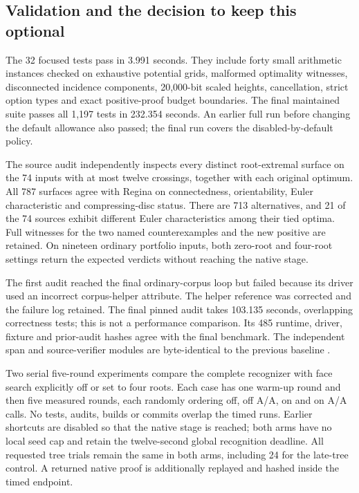\subsection{Validation and the decision to keep this optional}

The 32 focused tests pass in 3.991 seconds. They include forty small
arithmetic instances checked on exhaustive potential grids, malformed
optimality witnesses, disconnected incidence components, 20,000-bit scaled
heights, cancellation, strict option types and exact positive-proof budget
boundaries. The final maintained suite passes all 1,197 tests in
232.354 seconds. An earlier full run before changing the default allowance
also passed; the final run covers the disabled-by-default policy.

The source audit independently inspects every distinct root-extremal
surface on the 74 inputs with at most twelve crossings, together with each
original optimum. All 787 surfaces agree with Regina on connectedness,
orientability, Euler characteristic and compressing-disc status. There are
713 alternatives, and 21 of the 74 sources exhibit different Euler
characteristics among their tied optima. Full witnesses for the two named
counterexamples and the new positive are retained. On nineteen ordinary
portfolio inputs, both zero-root and four-root settings return the expected
verdicts without reaching the native stage.

The first audit reached the final ordinary-corpus loop but failed because
its driver used an incorrect corpus-helper attribute. The helper reference
was corrected and the failure log retained. The final pinned audit takes
103.135 seconds, overlapping correctness tests; this is not a performance
comparison. Its 485 runtime, driver, fixture and prior-audit hashes agree
with the final benchmark. The independent span and source-verifier modules
are byte-identical to the previous baseline .

Two serial five-round experiments compare the complete recognizer with
face search explicitly off or set to four roots. Each case has one warm-up
round and then five measured rounds, each randomly ordering off, off A/A,
on and on A/A calls. No tests, audits, builds or commits overlap the timed
runs. Earlier shortcuts are disabled so that the native stage is reached;
both arms have no local seed cap and retain the twelve-second global
recognition deadline. All requested tree trials remain the same in both
arms, including 24 for the late-tree control. A returned native proof is
additionally replayed and hashed inside the timed endpoint.

